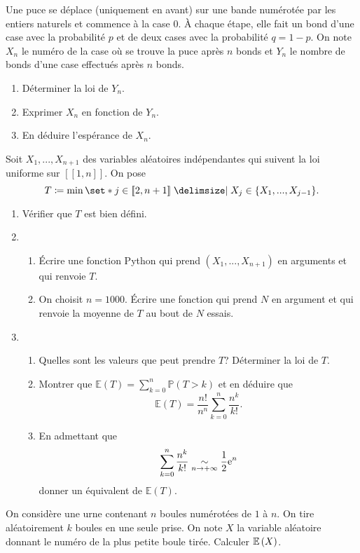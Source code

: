 \documentclass{magnolia}
\begin{document}
Une puce se déplace (uniquement en avant) sur une bande numérotée par les entiers naturels et commence à la case $0$. À chaque étape, elle fait un bond d'une case avec la probabilité $p$ et de deux cases avec la probabilité $q=1-p$.
On note $X_n$ le numéro de la case où se trouve la puce après $n$ bonds et $Y_n$ le nombre de bonds d'une case effectués après $n$ bonds.
\begin{enumerate}
\item Déterminer la loi de $Y_n$.
\item Exprimer $X_n$ en fonction de $Y_n$.
\item En déduire l'espérance de $X_n$.
\end{enumerate}

Soit $X_1, ... , X_{n+1}$ des variables aléatoires indépendantes qui suivent
la loi uniforme sur  $[\![1,n]\!]$.
On pose \[T\defeq\min \enstq{j\in [\![2,n+1]\!]}{X_j\in\{X_1,...,X_{j-1}\}}.\]
\begin{enumerate}
\item Vérifier que $T$ est bien défini.
\item %
\begin{enumerate}
\item \'Ecrire une fonction Python qui prend $(X_1,...,X_{n+1})$ en arguments 
et qui renvoie $T$.
\item  On choisit $n=1000$. \'Ecrire une fonction qui prend $N$ en argument 
et qui renvoie la moyenne de $T$ au bout de $N$ essais.
\end{enumerate}
\item
\begin{enumerate}
\item Quelles sont les valeurs que peut prendre $T$? 
Déterminer la loi de $T$.
\item Montrer que $\mathbb{E}(T)=\sum_{k=0}^n \mathbb{P}(T>k)$ et en déduire que
\[\mathbb{E}(T)=\frac{n!}{n^n}\sum_{k=0}^n \frac{n^k}{k!}.\]
\item 
En admettant que \[\sum_{k=0}^n \frac{n^k}{k!} \underset{n\rightarrow +\infty}{\sim} \frac{1}{2} {\rm e}^n\] donner un équivalent de $\mathbb{E}(T)$.
\end{enumerate}
\end{enumerate}


On considère une urne contenant $n$ boules numérotées de $1$ à $n$. On tire aléatoirement $k$ boules en une seule prise. On note $X$ la variable aléatoire donnant le numéro de la plus petite boule tirée. Calculer $\mathbb{E} \left( X \right)$.
\end{document}

